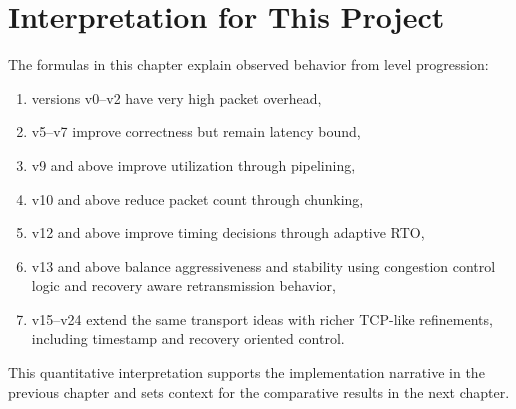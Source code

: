 \clearpage
\section{Interpretation for This Project}
The formulas in this chapter explain observed behavior from level progression:

\begin{enumerate}
    \item versions v0--v2 have very high packet overhead,
    \item v5--v7 improve correctness but remain latency bound,
    \item v9 and above improve utilization through pipelining,
    \item v10 and above reduce packet count through chunking,
    \item v12 and above improve timing decisions through adaptive RTO,
    \item v13 and above balance aggressiveness and stability using congestion
    control logic and recovery aware retransmission behavior,
    \item v15--v24 extend the same transport ideas with richer TCP-like
    refinements, including timestamp and recovery oriented control.
\end{enumerate}

This quantitative interpretation supports the implementation narrative in the
previous chapter and sets context for the comparative results in the next
chapter.